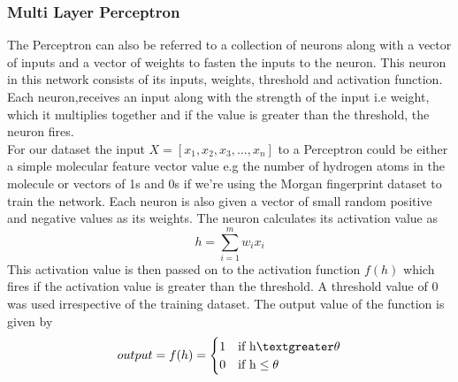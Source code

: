 \documentclass[a4paper,12pt]{report}
\begin{document}
				\subsubsection{Multi Layer Perceptron}
				The Perceptron can also be referred to a collection of neurons along with a vector of inputs and a vector of weights to fasten the inputs to the neuron. This neuron in this network consists of its inputs, weights, threshold and activation function. Each neuron,receives an input along with the strength of the input i.e weight, which it multiplies together and if the value is greater than the threshold, the neuron fires. \\
				For our dataset the input $X = [x_1,x_2,x_3,...,x_n]$ to a Perceptron could be either a simple molecular feature vector value e.g the number of hydrogen atoms in the molecule or vectors of 1s and 0s if we're using the Morgan fingerprint dataset to train the network. Each neuron is also given a vector of small random positive and negative values as its weights. The neuron calculates its activation value as 
				\begin{equation}
				h = \sum_{i=1}^{m}w_ix_i
				\end{equation}
				This activation value is then passed on to the activation function $f(h)$ which fires if the activation value is greater than the threshold. A threshold value of 0 was used irrespective of the training dataset. The output value of the function is given by
				\begin{equation}
				output = f(h) = 
				\begin{cases}
				1 & \text{if h} \textgreater \theta \\
				0 & \text{if h} \le \theta
				\end{cases}
				\end{equation}
\end{document}
